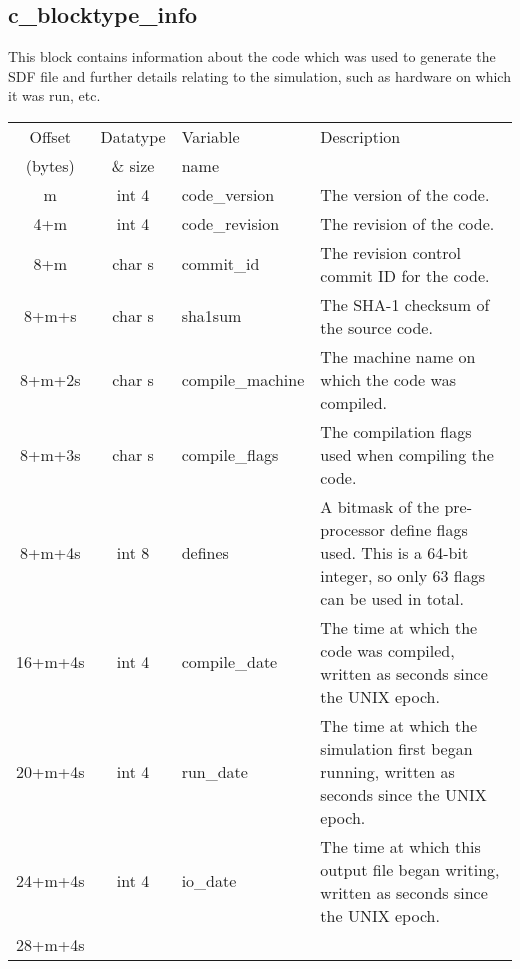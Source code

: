 \documentclass[12pt]{article}
\begin{document}
\subsection{c\_blocktype\_info}

This block contains information about the code which was used to generate
the SDF file and further details relating to the simulation, such as
hardware on which it was run, etc.\\

\begin{center}
\begin{tabularx}{0.9\textwidth}[!hbt]{cclX}
  Offset & Datatype & Variable & Description\\
  (bytes) & \& size & name &
  \\\toprule

  m & int 4 & code\_version & The version of the code.
  \\\midrule

  4+m & int 4 & code\_revision & The revision of the code.
  \\\midrule

  8+m & char s & commit\_id & The revision control commit ID for the code.
  \\\midrule

  8+m+s & char s & sha1sum & The SHA-1 checksum of the source code.
  \\\midrule

  8+m+2s & char s & compile\_machine & The machine name on which the code was
  compiled.
  \\\midrule

  8+m+3s & char s & compile\_flags & The compilation flags used when compiling
  the code.
  \\\midrule

  8+m+4s & int 8 & defines & A bitmask of the pre-processor define flags used.
  This is a 64-bit integer, so only 63 flags can be used in total.
  \\\midrule

  16+m+4s & int 4 & compile\_date & The time at which the code was compiled,
  written as seconds since the UNIX epoch.
  \\\midrule

  20+m+4s & int 4 & run\_date & The time at which the simulation first began
  running, written as seconds since the UNIX epoch.
  \\\midrule

  24+m+4s & int 4 & io\_date & The time at which this output file began writing,
  written as seconds since the UNIX epoch.
  \\\midrule

  28+m+4s &
\end{tabularx}
\end{center}\vspace{10pt}
\end{document}
